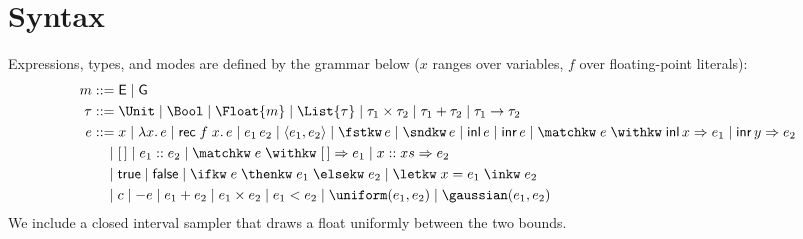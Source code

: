 \section{Syntax}
Expressions, types, and modes are defined by the grammar below ($x$ ranges over variables, $f$ over floating-point literals):
\begin{align*}
  m &::= \E \mid \G \\
  \tau &::= \Unit \mid \Bool \mid \Float{m} \mid \List{\tau} \mid \tau_1 \times \tau_2 \mid \tau_1 + \tau_2 \mid \tau_1 \to \tau_2 \\
  e &::= x \mid \lambda x.\,e \mid \mathsf{rec}\;f\;x.\,e \mid e_1\,e_2 \mid \langle e_1, e_2\rangle \mid \fstkw\,e \mid \sndkw\,e \mid \mathsf{inl}\,e \mid \mathsf{inr}\,e \mid \matchkw\;e\;\withkw\;\mathsf{inl}\,x \Rightarrow e_1 \mid \mathsf{inr}\,y \Rightarrow e_2 \\
    &\quad\mid [\,] \mid e_1 :: e_2 \mid \matchkw\;e\;\withkw\;[\,] \Rightarrow e_1 \mid x::xs \Rightarrow e_2 \\
    &\quad\mid \mathsf{true} \mid \mathsf{false} \mid \ifkw\;e\;\thenkw\;e_1\;\elsekw\;e_2 \mid \letkw\;x=e_1\;\inkw\;e_2 \\
    &\quad\mid c \mid -e \mid e_1 + e_2 \mid e_1 \times e_2 \mid e_1 < e_2 \mid \uniform(e_1,e_2) \mid \gaussian(e_1,e_2)
\end{align*}
We include a closed interval sampler that draws a float uniformly between the two bounds.

